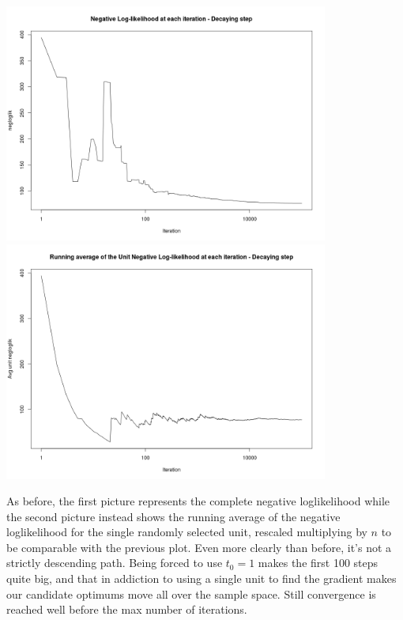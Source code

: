 \documentclass{article}
\begin{document}
\begin{center}
\includegraphics[width=0.8\textwidth]{Rplot_total_negloglik2.png} 
\includegraphics[width=0.8\textwidth]{Rplot_run_avg_unit_negloglik2.png}
\end{center}

As before, the first picture represents the complete negative loglikelihood while the second picture instead shows the running average of the negative loglikelihood for the single randomly selected unit, rescaled multiplying by $n$ to be comparable with the previous plot. Even more clearly than before, it's not a strictly descending path. Being forced to use $t_0=1$ makes the first 100 steps quite big, and that in addiction to using a single unit to find the gradient makes our candidate optimums move all over the sample space. Still convergence is reached well before the max number of iterations. 
\end{document}
